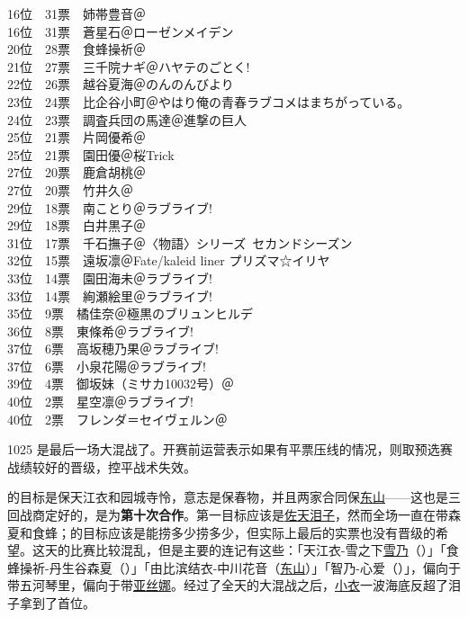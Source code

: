 {    16位　31票　姉帯豊音＠\Saki\\
    16位　31票　蒼星石＠ローゼンメイデン\\
    20位　28票　食蜂操祈＠\Railgan\\
    21位　27票　三千院ナギ＠ハヤテのごとく!\\
    22位　26票　越谷夏海＠のんのんびより\\
    23位　24票　比企谷小町＠やはり俺の青春ラブコメはまちがっている。\\
    24位　23票　調査兵団の馬達＠進撃の巨人\\
    25位　21票　片岡優希＠\Saki\\
    25位　21票　園田優＠桜Trick\\
    27位　20票　鹿倉胡桃＠\Saki\\
    27位　20票　竹井久＠\Saki\\
    29位　18票　南ことり＠ラブライブ!\\
    29位　18票　白井黒子＠\Railgan\\
    31位　17票　千石撫子＠〈物語〉シリーズ~セカンドシーズン\\
    32位　15票　遠坂凛＠Fate/kaleid liner プリズマ☆イリヤ\\
    33位　14票　園田海未＠ラブライブ!\\
    33位　14票　絢瀬絵里＠ラブライブ!\\
    35位　9票　橘佳奈＠極黒のブリュンヒルデ\\
    36位　8票　東條希＠ラブライブ!\\
    37位　6票　高坂穂乃果＠ラブライブ!\\
    37位　6票　小泉花陽＠ラブライブ!\\
    39位　4票　御坂妹（ミサカ10032号）＠\Railgan\\
    40位　2票　星空凛＠ラブライブ!\\
    40位　2票　フレンダ＝セイヴェルン＠\Railgan
}

1025 是最后一场大混战了。开赛前运营表示如果有平票压线的情况，则取预选赛战绩较好的晋级，控平战术失效。

的目标是保天江衣和园城寺怜，意志是保春物，并且两家合同保\uline{东山}——这也是三回战商定好的，是为\textbf{第十次合作}。第一目标应该是\uline{佐天泪子}，然而全场一直在带森夏和食蜂；的目标应该是能捞多少捞多少，但实际上最后的实票也没有晋级的希望。这天的比赛比较混乱，但是主要的连记有这些：「天江衣-雪之下\uline{雪乃}（）」「食蜂操祈-丹生谷森夏（）」「由比滨结衣-中川花音（\uline{东山}）」「智乃-心爱（）」，偏向于带五河琴里，偏向于带\uline{亚丝娜}。经过了全天的大混战之后，\uline{小衣}一波海底反超了泪子拿到了首位。

